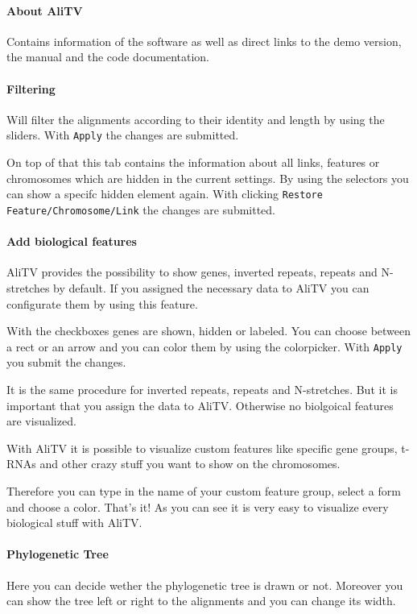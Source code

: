 \documentclass[a4paper]{scrartcl}
\begin{document}
\paragraph*{About AliTV}
Contains information of the software as well as direct links to the demo version, the manual and the code documentation.

\paragraph*{Filtering}
Will filter the alignments according to their identity and length by using the sliders. With \texttt{Apply} the changes are submitted.

On top of that this tab contains the information about all links, features or chromosomes which are hidden in the current settings. By using the selectors you can show a specifc hidden element again. With clicking \texttt{Restore Feature/Chromosome/Link} the changes are submitted.

\paragraph*{Add biological features}
AliTV provides the possibility to show genes, inverted repeats, repeats and N-stretches by default. If you assigned the necessary data to AliTV you can configurate them by using this feature. 

With the checkboxes genes are shown, hidden or labeled. You can choose between a rect or an arrow and you can color them by using the colorpicker. With \texttt{Apply} you submit the changes.

It is the same procedure for inverted repeats, repeats and N-stretches. But it is important that you assign the data to AliTV. Otherwise no biolgoical features are visualized.

With AliTV it is possible to visualize custom features like specific gene groups, t-RNAs and other crazy stuff you want to show on the chromosomes. 

Therefore you can type in the name of your custom feature group, select a form and choose a color. That's it! As you can see it is very easy to visualize every biological stuff with AliTV.

\paragraph*{Phylogenetic Tree}
Here you can decide wether the phylogenetic tree is drawn or not. Moreover you can show the tree left or right to the alignments and you can change its width.
\end{document}
